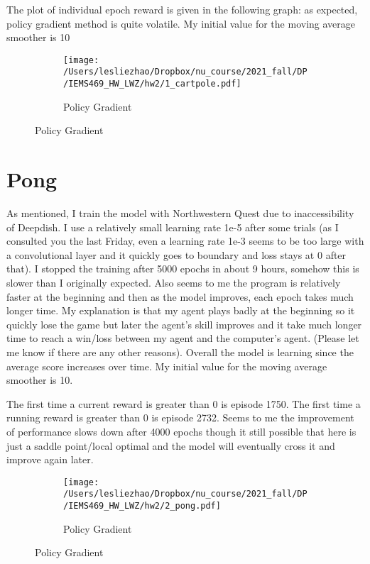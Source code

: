 \documentclass[12pt,letterpaper]{article}
\begin{document}
The plot of individual epoch reward is given in the following graph: as expected, policy gradient method is quite volatile. My initial value for the moving average smoother is 10
 \begin{figure}[H]
 	\centering
 	\caption{Cartpole game}
 	\begin{subfigure}[h]{0.9\textwidth}
 		\centering
 		\texttt{[image: /Users/lesliezhao/Dropbox/nu\_course/2021\_fall/DP/IEMS469\_HW\_LWZ/hw2/1\_cartpole.pdf]}
 		\caption{Policy Gradient}
 	\end{subfigure}
 \end{figure}


\section{Pong}
As mentioned, I train the model with Northwestern Quest due to inaccessibility of Deepdish. I use a relatively small learning rate 1e-5 after some trials (as I consulted you the last Friday, even a learning rate 1e-3 seems to be too large with a convolutional layer and it quickly goes to boundary and loss stays at 0 after that). I stopped the training after 5000 epochs in about 9 hours, somehow this is slower than I originally expected. Also seems to me the program is relatively faster at the beginning and then as the model improves, each epoch takes much longer time. My explanation is that my agent plays badly at the beginning so it quickly lose the game but later the agent's skill improves and it take much longer time to reach a win/loss between my agent and the computer's agent. (Please let me know if there are any other reasons). Overall the model is learning since the average score increases over time. My initial value for the moving average smoother is 10.

The first time a current reward is greater than 0 is episode 1750. The first time a running reward is greater than 0 is episode 2732. Seems to me the improvement of performance slows down after 4000 epochs though it still possible that here is just a saddle point/local optimal and the model will eventually cross it and improve again later. 
 \begin{figure}[H]
	\centering
	\caption{Pong game}
	\begin{subfigure}[h]{0.9\textwidth}
		\centering
		\texttt{[image: /Users/lesliezhao/Dropbox/nu\_course/2021\_fall/DP/IEMS469\_HW\_LWZ/hw2/2\_pong.pdf]}
		\caption{Policy Gradient}
	\end{subfigure}
\end{figure}
\end{document}
